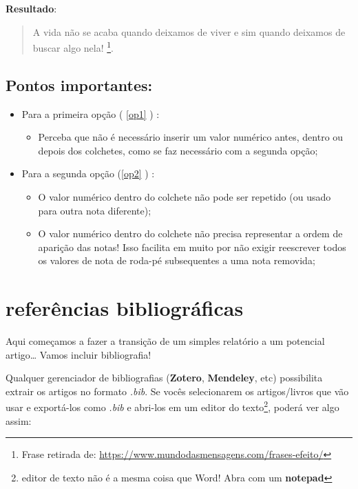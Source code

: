\documentclass[]{book}
\providecommand{\tightlist}{%
  \setlength{\itemsep}{0pt}\setlength{\parskip}{0pt}}
\begin{document}
\textbf{Resultado}:

\begin{quote}
A vida não se acaba quando deixamos de viver e sim quando deixamos de buscar algo nela! \footnote{Frase retirada de: \url{https://www.mundodasmensagens.com/frases-efeito/}}.
\end{quote}

\hypertarget{RodapeImportante}{%
\section{Pontos importantes:}\label{RodapeImportante}}

\begin{itemize}
\tightlist
\item
  Para a primeira opção ( \ref{op1} ) :

  \begin{itemize}
  \tightlist
  \item
    Perceba que não é necessário inserir um valor numérico antes, dentro ou depois dos colchetes, como se faz necessário com a segunda opção;\\
  \end{itemize}
\item
  Para a segunda opção (\ref{op2} ) :

  \begin{itemize}
  \tightlist
  \item
    O valor numérico dentro do colchete não pode ser repetido (ou usado para outra nota diferente);\\
  \item
    O valor numérico dentro do colchete não precisa representar a ordem de aparição das notas! Isso facilita em muito por não exigir reescrever todos os valores de nota de roda-pé subsequentes a uma nota removida;
  \end{itemize}
\end{itemize}

\hypertarget{referuxeancias-bibliogruxe1ficas}{%
\chapter{referências bibliográficas}\label{referuxeancias-bibliogruxe1ficas}}

Aqui começamos a fazer a transição de um simples relatório a um potencial artigo\ldots{} Vamos incluir bibliografia!

Qualquer gerenciador de bibliografias (\textbf{Zotero}, \textbf{Mendeley}, etc) possibilita extrair os artigos no formato \emph{.bib}. Se vocês selecionarem os artigos/livros que vão usar e exportá-los como \emph{.bib} e abri-los em um editor do texto\footnote{editor de texto não é a mesma coisa que Word! Abra com um \textbf{notepad}}, poderá ver algo assim:
\end{document}
